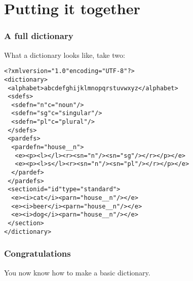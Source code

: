 \documentclass{beamer} %
\begin{document}
\section{Putting it together}
\begin{frame}
  \frametitle{A full dictionary}

  \begin{exampleblock}{What a dictionary looks like, take two:}
    \begin{footnotesize}
    \begin{alltt}
      <?xml version="1.0" encoding="UTF-8"?>\\
      <dictionary>\\
      ~<alphabet>abcdefghijklmnopqrstuvwxyz</alphabet>\\
      ~<sdefs>\\
      ~~<sdef n="n" c="noun"/>\\
      ~~<sdef n="sg" c="singular"/>\\
      ~~<sdef n="pl" c="plural"/>\\
      ~</sdefs>\\
      ~<pardefs>\\
      ~~<pardef n="house\_\_n">\\
      ~~~<e><p><l></l><r><s n="n"/><s n="sg"/></r></p></e> \\
      ~~~<e><p><l>s</l><r><s n="n"/><s n="pl"/></r></p></e> \\
      ~~</pardef>\\
      ~</pardefs>\\
      ~<section id="id" type="standard">\\
      ~~<e><i>cat</i><par n="house\_\_n"/></e> \\
      ~~<e><i>beer</i><par n="house\_\_n"/></e> \\
      ~~<e><i>dog</i><par n="house\_\_n"/></e> \\
      ~</section>\\
      </dictionary>\\
    \end{alltt}
    \end{footnotesize}
\end{exampleblock}
\end{frame}

\begin{frame}
\frametitle{Congratulations}
You now know how to make a basic dictionary.
\end{frame}
\end{document}
